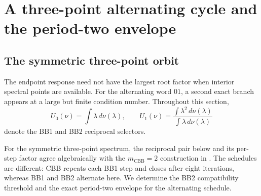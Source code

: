 \documentclass[letterpaper,twoside]{article}
\begin{document}
\section{A three-point alternating cycle and the period-two envelope}
\label{sec:three-point}

\subsection{The symmetric three-point orbit}

The endpoint response need not have the largest root factor when interior
spectral points are available.  For the alternating word $01$, a second exact branch appears at a large but finite
condition number.  Throughout this section,
\[
 U_0(\nu)=\int\lambda\,d\nu(\lambda),
 \qquad
 U_1(\nu)=\frac{\int\lambda^2\,d\nu(\lambda)}
                 {\int\lambda\,d\nu(\lambda)}
\]
denote the BB1 and BB2 reciprocal selectors.

For the symmetric three-point spectrum, the reciprocal pair below and its per-step factor agree
algebraically with the $m_{\mathrm{CBB}}=2$ construction in
\cite[eqs.~(3.21)--(3.23)]{DaiHagerSchittkowskiZhang2006}.  The schedules are
different: CBB repeats each BB1 step and closes after eight iterations, whereas
BB1 and BB2 alternate here.  We determine the BB2 compatibility threshold and
the exact period-two envelope for the alternating schedule.
\end{document}
